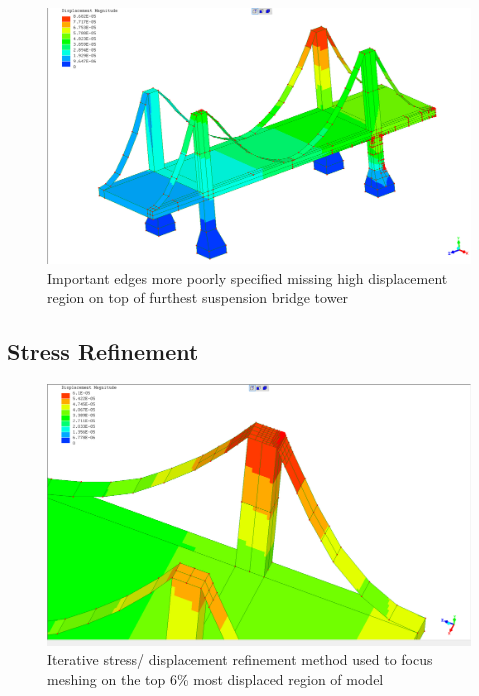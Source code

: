 \begin{figure}[H]
  \centerline{\includegraphics[width=165mm, scale=0.5]{../Graphics/BridgeCrossLoading/okEdgeSpecResults.png}}
  \caption{Important edges more poorly specified missing high displacement region on top of furthest suspension bridge tower}
\end{figure}

\subsection{Stress Refinement}
\begin{figure}[H]
  \centerline{\includegraphics[width=165mm, scale=0.5]{../Graphics/BridgeCrossLoading/the90thPercentileRefinement.png}}
  \caption{Iterative stress/ displacement refinement method used to focus meshing on the top 6\% most displaced region of model}
\end{figure}

